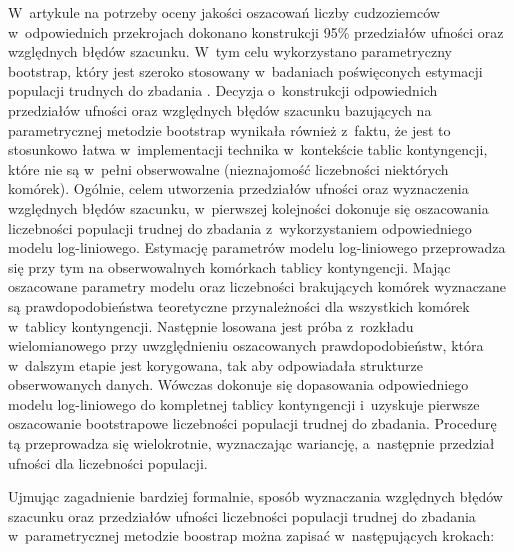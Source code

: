 \documentclass[12pt,a4paper]{article}
\begin{document}
W~artykule na potrzeby oceny jakości oszacowań liczby cudzoziemców w~odpowiednich przekrojach dokonano konstrukcji 95\% przedziałów ufności oraz względnych błędów szacunku. W~tym celu wykorzystano parametryczny bootstrap, który jest szeroko stosowany w~badaniach poświęconych estymacji populacji trudnych do zbadania \citep{zwane2003implementing}. Decyzja o~konstrukcji odpowiednich przedziałów ufności oraz względnych błędów szacunku bazujących na parametrycznej metodzie bootstrap wynikała również z~faktu, że jest to stosunkowo łatwa w~implementacji technika w~kontekście tablic kontyngencji, które nie są w~pełni obserwowalne (nieznajomość liczebności niektórych komórek). Ogólnie, celem utworzenia przedziałów ufności oraz wyznaczenia względnych błędów szacunku, w~pierwszej kolejności dokonuje się oszacowania liczebności populacji trudnej do zbadania z~wykorzystaniem odpowiedniego modelu log-liniowego. Estymację parametrów modelu log-liniowego przeprowadza się przy tym na obserwowalnych komórkach tablicy kontyngencji. Mając oszacowane parametry modelu oraz liczebności brakujących komórek wyznaczane są prawdopodobieństwa teoretyczne przynależności dla wszystkich komórek w~tablicy kontyngencji. Następnie losowana jest próba z~rozkładu wielomianowego przy uwzględnieniu oszacowanych prawdopodobieństw, która w~dalszym etapie jest korygowana, tak aby odpowiadała strukturze obserwowanych danych. Wówczas dokonuje się dopasowania odpowiedniego modelu log-liniowego do kompletnej tablicy kontyngencji i~uzyskuje pierwsze oszacowanie bootstrapowe liczebności populacji trudnej do zbadania. Procedurę tą przeprowadza się wielokrotnie, wyznaczając wariancję, a~następnie przedział ufności dla liczebności populacji. 

Ujmując zagadnienie bardziej formalnie, sposób wyznaczania względnych błędów szacunku oraz przedziałów ufności liczebności populacji trudnej do zbadania w~parametrycznej metodzie boostrap można zapisać w~następujących krokach:
\end{document}
